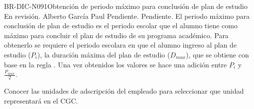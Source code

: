 \begin{BusinessRule}{BR-DIC-N091}{Obtención de periodo máximo para conclusión de plan de estudio}
	{\bcDerivation} %
	{\btTimer}     %
	{\blControlling}     %
	\BRItem[Estado] En revisión.
	 Alberto García Paul
	 Pendiente.
	 Pendiente.
	\BRItem[Descripción] El periodo máximo para conclusión de plan de estudio es el periodo escolar que el alumno tiene como máximo para concluir el plan de estudio de su programa académico. Para obtenerlo se requiere el periodo escolara en que el alumno ingreso al plan de estudio ($P_{i}$), la duración máxima del plan de estudio ($D_{max}$), que se obtiene con base en la regla . Una vez obtenidos los valores se hace una adición entre $P_{i}$ y $\frac{P_{max}}{2}$.
	\BRItem[Sentencia] \cdtEmpty
	
	\BRItem[Motivación] Conocer las unidades de adscripción del empleado para seleccionar que unidad representará en el CGC.
\end{BusinessRule}

